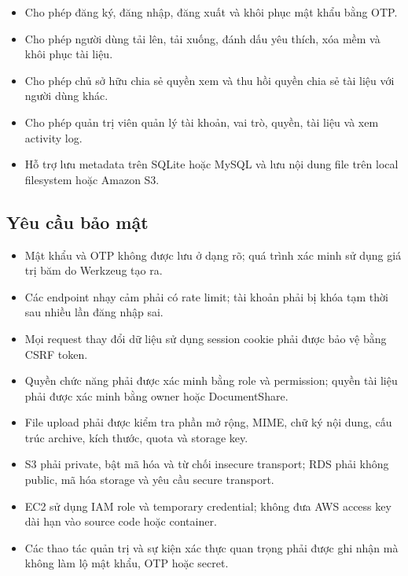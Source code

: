 \begin{itemize}
    \item Cho phép đăng ký, đăng nhập, đăng xuất và
    khôi phục mật khẩu bằng OTP.

    \item Cho phép người dùng tải lên, tải xuống,
    đánh dấu yêu thích, xóa mềm và khôi phục tài liệu.

    \item Cho phép chủ sở hữu chia sẻ quyền xem và
    thu hồi quyền chia sẻ tài liệu với người dùng khác.

    \item Cho phép quản trị viên quản lý tài khoản,
    vai trò, quyền, tài liệu và xem activity log.

    \item Hỗ trợ lưu metadata trên SQLite hoặc MySQL
    và lưu nội dung file trên local filesystem
    hoặc Amazon S3.
\end{itemize}

\subsection{Yêu cầu bảo mật}

\begin{itemize}
    \item Mật khẩu và OTP không được lưu ở dạng rõ;
    quá trình xác minh sử dụng giá trị băm do
    Werkzeug tạo ra.

    \item Các endpoint nhạy cảm phải có rate limit;
    tài khoản phải bị khóa tạm thời sau nhiều lần
    đăng nhập sai.

    \item Mọi request thay đổi dữ liệu sử dụng
    session cookie phải được bảo vệ bằng CSRF token.

    \item Quyền chức năng phải được xác minh bằng
    role và permission; quyền tài liệu phải được
    xác minh bằng owner hoặc DocumentShare.

    \item File upload phải được kiểm tra phần mở rộng,
    MIME, chữ ký nội dung, cấu trúc archive, kích thước,
    quota và storage key.

    \item S3 phải private, bật mã hóa và từ chối
    insecure transport; RDS phải không public,
    mã hóa storage và yêu cầu secure transport.

    \item EC2 sử dụng IAM role và temporary credential;
    không đưa AWS access key dài hạn vào source code
    hoặc container.

    \item Các thao tác quản trị và sự kiện xác thực
    quan trọng phải được ghi nhận mà không làm lộ
    mật khẩu, OTP hoặc secret.
\end{itemize}

